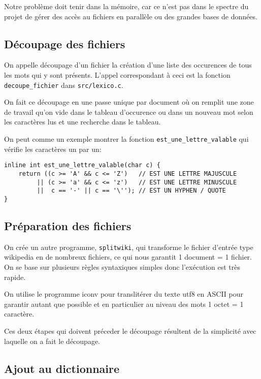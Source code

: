 Notre problème doit tenir dans la mémoire,
car ce n'est pas dans le spectre du projet de gérer des accès
au fichiers en parallèle ou des grandes bases de données.

\subsection{Découpage des fichiers}

On appelle découpage d'un fichier la création d'une
liste des occurences de tous les mots qui y sont présents.
L'appel correspondant à ceci est la fonction {\tt decoupe\_fichier}
dans {\tt src/lexico.c}.

On fait ce découpage en une passe unique par document
où on remplit une zone de travail qu'on vide dans le tableau
d'occurence ou dans un nouveau mot selon les caractères lus
et une recherche dans le tableau.

On peut comme un exemple montrer la fonction
{\tt est\_une\_lettre\_valable} qui vérifie les caractères
un par un:

\begin{verbatim}
inline int est_une_lettre_valable(char c) {
    return ((c >= 'A' && c <= 'Z')   // EST UNE LETTRE MAJUSCULE
         || (c >= 'a' && c <= 'z')   // EST UNE LETTRE MINUSCULE
         ||  c == '-' || c == '\''); // EST UN HYPHEN / QUOTE
}
\end{verbatim}

\subsection{Préparation des fichiers}

On crée un autre programme, {\tt splitwiki}, qui transforme le
fichier d'entrée type wikipedia en de nombreux fichiers,
ce qui nous garantit 1 document = 1 fichier.
On se base sur plusieurs règles syntaxiques simples
donc l'exécution est très rapide.

On utilise le programme iconv pour translitérer du
texte utf8 en ASCII pour garantir autant que possible
et en particulier au niveau des mots 1 octet = 1 caractère.

Ces deux étapes qui doivent préceder le découpage
résultent de la simplicité avec laquelle on a fait
le découpage.

\subsection{Ajout au dictionnaire}

